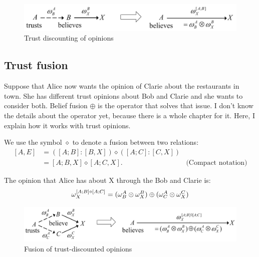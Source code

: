 \documentclass[a4paper,12pt]{article}
\theoremstyle{definition}
\numberwithin{equation}{section}
\begin{document}
\begin{figure}[htb]
	\centering
	\includegraphics[scale=0.3]{images/trust-discounting-of-opinions.png}
	\caption{Trust discounting of opinions}
\end{figure}

\subsection{Trust fusion}

Suppose that Alice now wants the opinion of Clarie about the restaurants in town. She has different trust opinions about Bob and Clarie and she wants to consider both. Belief fusion $\oplus$ is the operator that solves that issue. I don't know the details about the operator yet, because there is a whole chapter for it. Here, I explain how it works with trust opinions.

We use the symbol $\diamond$ to denote a fusion between two relations:
\begin{equation}
	\begin{array}{rll}
		[A,E] & = ([A; B] : [B, X]) \diamond([A; C] : [C, X]) \\
		& = [A; B, X] \diamond [A; C, X] \text{.} & \text{(Compact notation)}
	\end{array}
\end{equation}

The opinion that Alice has about X through the Bob and Clarie is:
\begin{equation}
	\omega^{[A; B] \diamond [A; C]}_{X} = (\omega^{A}_{B} \otimes \omega^{B}_{X}) \oplus (\omega^{A}_{C} \otimes \omega^{C}_{X})
\end{equation}

\begin{figure}[htb]
	\centering
	\includegraphics[scale=0.32]{images/fusion-of-trust-discounted-opinions.png}
	\caption{Fusion of trust-discounted opinions}
\end{figure}

%
%	
%	
\end{document}
